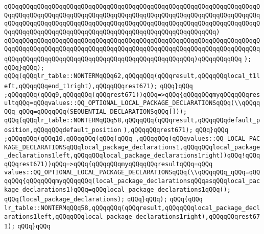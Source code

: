 \verb|qQQqqQQqqQQqqQQqqQQqqQQqqQQqqQQqqQQqqQQqqQQqqQQqqQQqqQQqqQQqqQQqqQQqqQQqqQQqqQQqqQQqqQQqqQQqqQQqqQQqqQQqqQQqqQQqqQQqqQQqqQQqqQQqqQQqqQQqqQQqqQQqqQQqqQQqqQQqqQQqqQQqqQQqqQQqqQQqqQQqqQQqqQQqqQQqqQQqqQQqqQQqqQQqqQQqqQQqqQQqqQQqqQQqqQQqqQQqqQQqqQQqqQQqqQQqqQQqqQQqqQQqqQQq)|\newline
\verb|qQQqqQQqqQQqqQQqqQQqqQQqqQQqqQQqqQQqqQQqqQQqqQQqqQQqqQQqqQQqqQQqqQQqqQQqqQQqqQQqqQQqqQQqqQQqqQQqqQQqqQQqqQQqqQQqqQQqqQQqqQQqqQQqqQQqqQQqqQQqqQQqqQQqqQQqqQQqqQQqqQQqqQQqqQQqqQQqqQQqqQQqqQQqqQQq)qQQqqQQqqQQq|\newline
\verb|);|\newline
\verb|qQQq}qQQq);|\newline
\verb|qQQq(qQQqlr_table::NONTERMqQQq62,qQQqqQQq(qQQqresult,qQQqqQQqlocal_t1left,qQQqqQQqend_t1right),qQQqqQQqrest671);|\newline
\verb|qQQq}qQQq|\newline
\verb|;qQQqqQQq(qQQq9,qQQqqQQq(qQQqrest671))qQQq=>qQQq{qQQqqQQqmyqQQqqQQqresultqQQq=qQQqvalues::QQ_OPTIONAL_LOCAL_PACKAGE_DECLARATIONSqQQq(\\qQQqqQQq_qQQq=qQQqqQQq(SEQUENTIAL_DECLARATIONSqQQq[]));|\newline
\verb|qQQq(qQQqlr_table::NONTERMqQQq58,qQQqqQQq(qQQqresult,qQQqqQQqdefault_position,qQQqqQQqdefault_position|\newline
\verb|),qQQqqQQqrest671);|\newline
\verb|qQQq}qQQq|\newline
\verb|;qQQqqQQq(qQQq10,qQQqqQQq(qQQq(qQQq_,qQQqqQQq(qQQqvalues::QQ_LOCAL_PACKAGE_DECLARATIONSqQQqlocal_package_declarations1,qQQqqQQqlocal_package_declarations1left,qQQqqQQqlocal_package_declarations1right))qQQq!qQQqqQQqrest671))qQQq=>qQQq{qQQqqQQqmyqQQqqQQqresultqQQq=qQQq|\newline
\verb|values::QQ_OPTIONAL_LOCAL_PACKAGE_DECLARATIONSqQQq(\\qQQqqQQq_qQQq=qQQqqQQq{qQQqqQQqmyqQQqqQQq(local_package_declarationsqQQqasqQQqlocal_package_declarations1)qQQq=qQQqlocal_package_declarations1qQQq();|\newline
\verb|qQQq(local_package_declarations);|\newline
\verb|qQQq}qQQq);|\newline
\verb|qQQq(qQQq|\newline
\verb|lr_table::NONTERMqQQq58,qQQqqQQq(qQQqresult,qQQqqQQqlocal_package_declarations1left,qQQqqQQqlocal_package_declarations1right),qQQqqQQqrest671);|\newline
\verb|qQQq}qQQq|\newline
